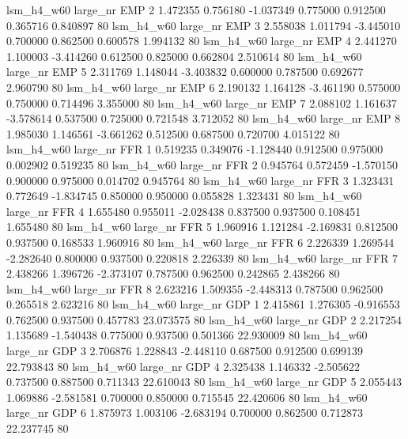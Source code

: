   lsm_h4_w60   large_nr      EMP                 2  1.472355  0.756180  -1.037349 0.775000 0.912500  0.365716    0.840897 80
  lsm_h4_w60   large_nr      EMP                 3  2.558038  1.011794  -3.445010 0.700000 0.862500  0.600578    1.994132 80
  lsm_h4_w60   large_nr      EMP                 4  2.441270  1.100003  -3.414260 0.612500 0.825000  0.662804    2.510614 80
  lsm_h4_w60   large_nr      EMP                 5  2.311769  1.148044  -3.403832 0.600000 0.787500  0.692677    2.960790 80
  lsm_h4_w60   large_nr      EMP                 6  2.190132  1.164128  -3.461190 0.575000 0.750000  0.714496    3.355000 80
  lsm_h4_w60   large_nr      EMP                 7  2.088102  1.161637  -3.578614 0.537500 0.725000  0.721548    3.712052 80
  lsm_h4_w60   large_nr      EMP                 8  1.985030  1.146561  -3.661262 0.512500 0.687500  0.720700    4.015122 80
  lsm_h4_w60   large_nr      FFR                 1  0.519235  0.349076  -1.128440 0.912500 0.975000  0.002902    0.519235 80
  lsm_h4_w60   large_nr      FFR                 2  0.945764  0.572459  -1.570150 0.900000 0.975000  0.014702    0.945764 80
  lsm_h4_w60   large_nr      FFR                 3  1.323431  0.772649  -1.834745 0.850000 0.950000  0.055828    1.323431 80
  lsm_h4_w60   large_nr      FFR                 4  1.655480  0.955011  -2.028438 0.837500 0.937500  0.108451    1.655480 80
  lsm_h4_w60   large_nr      FFR                 5  1.960916  1.121284  -2.169831 0.812500 0.937500  0.168533    1.960916 80
  lsm_h4_w60   large_nr      FFR                 6  2.226339  1.269544  -2.282640 0.800000 0.937500  0.220818    2.226339 80
  lsm_h4_w60   large_nr      FFR                 7  2.438266  1.396726  -2.373107 0.787500 0.962500  0.242865    2.438266 80
  lsm_h4_w60   large_nr      FFR                 8  2.623216  1.509355  -2.448313 0.787500 0.962500  0.265518    2.623216 80
  lsm_h4_w60   large_nr      GDP                 1  2.415861  1.276305  -0.916553 0.762500 0.937500  0.457783   23.073575 80
  lsm_h4_w60   large_nr      GDP                 2  2.217254  1.135689  -1.540438 0.775000 0.937500  0.501366   22.930009 80
  lsm_h4_w60   large_nr      GDP                 3  2.706876  1.228843  -2.448110 0.687500 0.912500  0.699139   22.793843 80
  lsm_h4_w60   large_nr      GDP                 4  2.325438  1.146332  -2.505622 0.737500 0.887500  0.711343   22.610043 80
  lsm_h4_w60   large_nr      GDP                 5  2.055443  1.069886  -2.581581 0.700000 0.850000  0.715545   22.420606 80
  lsm_h4_w60   large_nr      GDP                 6  1.875973  1.003106  -2.683194 0.700000 0.862500  0.712873   22.237745 80
